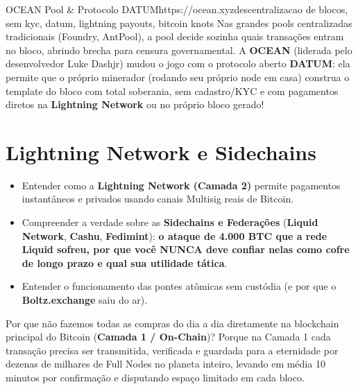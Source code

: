 \documentclass{pousadaguide}
\begin{document}
\begin{ferramenta}[recomendado,logo=ocean]{OCEAN Pool \& Protocolo DATUM}{https://ocean.xyz}{descentralizacao de blocos, sem kyc, datum, lightning payouts, bitcoin knots}
Nas grandes pools centralizadas tradicionais (Foundry, AntPool), a pool decide sozinha quais transações entram no bloco, abrindo brecha para censura governamental. A \textbf{OCEAN} (liderada pelo desenvolvedor Luke Dashjr) mudou o jogo com o protocolo aberto \textbf{DATUM}: ela permite que o próprio minerador (rodando seu próprio node em casa) construa o template do bloco com total soberania, sem cadastro/KYC e com pagamentos diretos na \textbf{Lightning Network} ou no próprio bloco gerado! 
\end{ferramenta}

\chapter{Lightning Network e Sidechains}

\begin{missao}
\begin{itemize}
  \item Entender como a \textbf{Lightning Network (Camada 2)} permite pagamentos instantâneos e privados usando canais Multisig reais de Bitcoin.
  \item Compreender a verdade sobre as \textbf{Sidechains e Federações} (\textbf{Liquid Network}, \textbf{Cashu}, \textbf{Fedimint}): \textbf{o ataque de 4.000 BTC que a rede Liquid sofreu, por que você NUNCA deve confiar nelas como cofre de longo prazo e qual sua utilidade tática}.
  \item Entender o funcionamento das pontes atômicas sem custódia (e por que o \textbf{Boltz.exchange} saiu do ar).
\end{itemize}
\end{missao}

Por que não fazemos todas as compras do dia a dia diretamente na blockchain principal do Bitcoin (\textbf{Camada 1 / On-Chain})? Porque na Camada 1 cada transação precisa ser transmitida, verificada e guardada para a eternidade por dezenas de milhares de Full Nodes no planeta inteiro, levando em média 10 minutos por confirmação e disputando espaço limitado em cada bloco.
\end{document}
